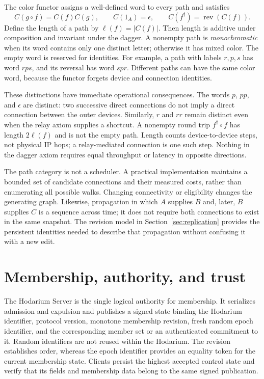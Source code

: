 \documentclass[11pt,a4paper]{article}
\theoremstyle{definition}
\theoremstyle{plain}
\newcommand{\rev}{\operatorname{rev}}
\begin{document}
The color functor assigns a well-defined word to every path and satisfies
\begin{equation}
 C(g\circ f)=C(f)C(g),\qquad C(1_A)=\epsilon,
 \qquad C(f^\dagger)=\rev(C(f)).
 \label{eq:color}
\end{equation}
Define the length of a path by $\ell(f)=|C(f)|$. Then length is additive
under composition and invariant under the dagger. A nonempty path is
\emph{monochromatic} when its word contains only one distinct letter;
otherwise it has mixed color. The empty word is reserved for identities.
For example, a path with labels $r,p,s$ has word $rps$, and its reversal
has word $spr$. Different paths can have the same color word, because
the functor forgets device and connection identities.

These distinctions have immediate operational consequences. The words
$p$, $pp$, and $\epsilon$ are distinct: two successive direct connections
do not imply a direct connection between the outer devices. Similarly,
$r$ and $rr$ remain distinct even when the relay axiom supplies a
shortcut. A nonempty round trip $f^\dagger\circ f$ has length
$2\ell(f)$ and is not the empty path. Length counts device-to-device
steps, not physical IP hops; a relay-mediated connection is one such
step. Nothing in the dagger axiom requires equal throughput or latency
in opposite directions.

The path category is not a scheduler. A practical implementation
maintains a bounded set of candidate connections and their measured
costs, rather than enumerating all possible walks.
Changing connectivity or eligibility changes the generating graph.
Likewise, propagation in which $A$ supplies $B$ and, later, $B$ supplies
$C$ is a sequence across time; it does not require both connections to
exist in the same snapshot. The revision model in
Section~\ref{sec:replication} provides the persistent identities needed
to describe that propagation without confusing it with a new edit.

\section{Membership, authority, and trust}
\label{sec:membership}

The Hodarium Server is the single logical authority for membership.
It serializes admission and expulsion and publishes a signed state
binding the Hodarium identifier, protocol version, monotone membership
revision, fresh random epoch identifier, and the corresponding member
set or an authenticated commitment to it. Random identifiers are not
reused within the Hodarium. The revision establishes order, whereas
the epoch identifier provides an equality token for the current
membership state. Clients persist the highest accepted control state
and verify that its fields and membership data belong to the same
signed publication.
\end{document}
